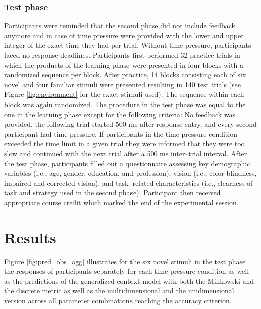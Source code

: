 \documentclass[a4paper,man,natbib]{apa6}
\begin{document}
\subsubsection{Test phase}
Participants were reminded that the second phase did not include feedback anymore and in case of time pressure were provided with the lower and upper integer of the exact time they had per trial. Without time pressure, participants faced no response deadlines. Participants first performed 32 practice trials in which the products of the learning phase were presented in four blocks with a randomized sequence per block. After practice, 14 blocks consisting each of six novel and four familiar stimuli were presented resulting in 140 test trials (see Figure \ref{fig:environment} for the exact stimuli used). The sequence within each block was again randomized. The procedure in the test phase was equal to the one in the learning phase except for the following criteria: No feedback was provided, the following trial started 500 ms after response entry, and every second participant had time pressure. If participants in the time pressure condition exceeded the time limit in a given trial they were informed that they were too slow and continued with the next trial after a 500 ms inter--trial interval. After the test phase, participants filled out a questionnaire assessing key demographic variables (i.e., age, gender, education, and profession), vision (i.e., color blindness, impaired and corrected vision), and task--related characteristics (i.e., clearness of task and strategy used in the second phase). Participant then received appropriate course credit which marked the end of the experimental session.

\section{Results}
Figure \ref{fig:pred_obs_agg} illustrates for the six novel stimuli in the test phase the responses of participants separately for each time pressure condition as well as the predictions of the generalized context model with both the Minkowski and the discrete metric as well as the multidimensional and the unidimensional version across all parameter combinations reaching the accuracy criterion.
\end{document}
